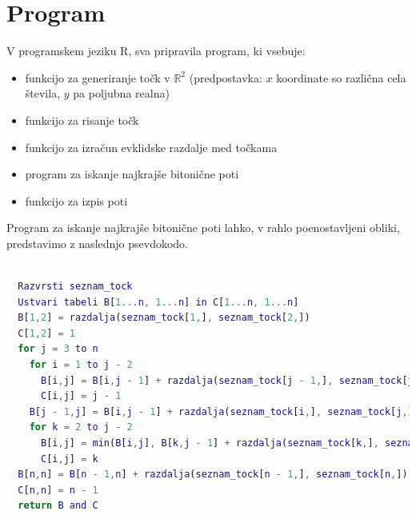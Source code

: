 \documentclass[12pt,a4paper]{amsart}
\theoremstyle{definition}
\theoremstyle{plain}
\newcommand{\R}{\mathbb R}
\begin{document}
\section{Program}

\noindent
V programskem jeziku R, sva pripravila program, ki vsebuje:

\begin{itemize}
  \item funkcijo za generiranje točk v $\R^2$ (predpostavka: $x$ koordinate so različna
  cela števila, $y$ pa poljubna realna)
  \item funkcijo za risanje točk
  \item funkcijo za izračun evklidske razdalje med točkama
  \item program za iskanje najkrajše bitonične poti
  \item funkcijo za izpis poti
  \newline
\end{itemize}


\noindent
Program za iskanje najkrajše bitonične poti lahko, v rahlo poenostavljeni obliki, predstavimo z naslednjo
psevdokodo.
\newline

\begin{lstlisting}[basicstyle=\tiny, language=Matlab]

  Razvrsti seznam_tock
  Ustvari tabeli B[1...n, 1...n] in C[1...n, 1...n]
  B[1,2] = razdalja(seznam_tock[1,], seznam_tock[2,])
  C[1,2] = 1
  for j = 3 to n
    for i = 1 to j - 2
      B[i,j] = B[i,j - 1] + razdalja(seznam_tock[j - 1,], seznam_tock[j,])
      C[i,j] = j - 1
    B[j - 1,j] = B[i,j - 1] + razdalja(seznam_tock[i,], seznam_tock[j,])
    for k = 2 to j - 2
      B[i,j] = min(B[i,j], B[k,j - 1] + razdalja(seznam_tock[k,], seznam_tock[j,]))
      C[i,j] = k
  B[n,n] = B[n - 1,n] + razdalja(seznam_tock[n - 1,], seznam_tock[n,])
  C[n,n] = n - 1
  return B and C

\end{lstlisting}
\end{document}
